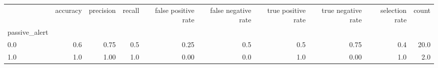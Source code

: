 \begin{tabular}{lrrrrrrrrr}
\toprule
{} &  accuracy &  precision &  recall &  false positive rate &  false negative rate &  true positive rate &  true negative rate &  selection rate &  count \\
passive\_alert &           &            &         &                      &                      &                     &                     &                 &        \\
\midrule
0.0           &       0.6 &       0.75 &     0.5 &                 0.25 &                  0.5 &                 0.5 &                0.75 &             0.4 &   20.0 \\
1.0           &       1.0 &       1.00 &     1.0 &                 0.00 &                  0.0 &                 1.0 &                0.00 &             1.0 &    2.0 \\
\bottomrule
\end{tabular}
